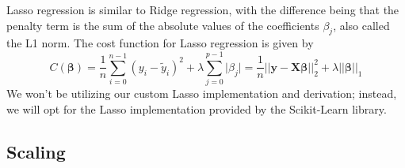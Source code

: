 \documentclass[twoside,11pt]{report}
\begin{document}
Lasso regression is similar to Ridge regression, with the difference being that the penalty term is the sum of the absolute values of the coefficients $\beta_j$, also called 
the L1 norm. The cost function for Lasso regression is given by
$$
C(\mathbf{\beta}) = \frac{1}{n}\sum_{i=0}^{n-1}(y_i-\tilde{y}_i)^2 + \lambda\sum_{j=0}^{p-1}\vert\beta_j\vert
=\frac{1}{n}\vert\vert \mathbf{y}-\mathbf{X}\mathbf{\beta}\vert\vert_2^2 + \lambda\vert\vert\mathbf{\beta}\vert\vert_1
$$
We won't be utilizing our custom Lasso implementation and derivation; instead, 
we will opt for the Lasso implementation provided by the Scikit-Learn library.


\subsection{Scaling}
\label{sec:scaling}
\end{document}
